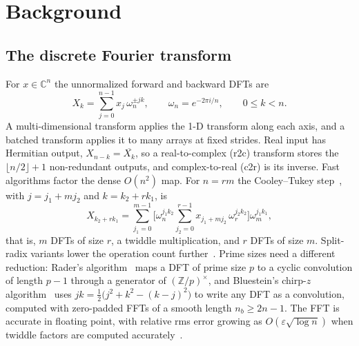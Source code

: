 \documentclass[10pt]{article}
\theoremstyle{definition}
\begin{document}
\section{Background}\label{sec:background}

\subsection{The discrete Fourier transform}
For $x\in\mathbb{C}^n$ the unnormalized forward and backward DFTs are
\begin{equation}
X_k=\sum_{j=0}^{n-1}x_j\,\omega_n^{\pm jk},\qquad \omega_n=e^{-2\pi i/n},\qquad 0\le k<n .
\end{equation}
A multi-dimensional transform applies the 1-D transform along each axis, and a batched transform applies it to many arrays at fixed strides. Real input has Hermitian output, $X_{n-k}=\overline{X_k}$, so a real-to-complex (r2c) transform stores the $\lfloor n/2\rfloor+1$ non-redundant outputs, and complex-to-real (c2r) is its inverse. Fast algorithms factor the dense $O(n^2)$ map. For $n=rm$ the Cooley--Tukey step~\cite{cooley1965,vanloan1992}, with $j=j_1+mj_2$ and $k=k_2+rk_1$, is
\begin{equation}\label{eq:ct}
X_{k_2+rk_1}=\sum_{j_1=0}^{m-1}\Big[\omega_n^{j_1k_2}\sum_{j_2=0}^{r-1}x_{j_1+mj_2}\,\omega_r^{j_2k_2}\Big]\omega_m^{j_1k_1},
\end{equation}
that is, $m$ DFTs of size $r$, a twiddle multiplication, and $r$ DFTs of size $m$. Split-radix variants lower the operation count further~\cite{duhamel1984splitradix,johnson2007splitradix}. Prime sizes need a different reduction: Rader's algorithm~\cite{rader1968} maps a DFT of prime size $p$ to a cyclic convolution of length $p-1$ through a generator of $(\mathbb{Z}/p)^\times$, and Bluestein's chirp-$z$ algorithm~\cite{bluestein1970} uses $jk=\tfrac12\big(j^2+k^2-(k-j)^2\big)$ to write any DFT as a convolution, computed with zero-padded FFTs of a smooth length $n_b\ge 2n-1$. The FFT is accurate in floating point, with relative rms error growing as $O(\varepsilon\sqrt{\log n})$ when twiddle factors are computed accurately~\cite{schatzman1996}.
\end{document}
